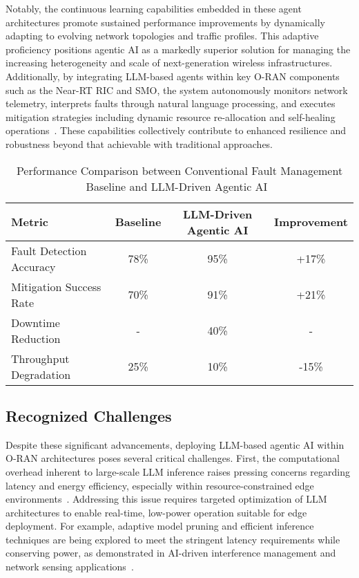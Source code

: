 \documentclass[sigconf]{acmart}
\begin{document}
Notably, the continuous learning capabilities embedded in these agent architectures promote sustained performance improvements by dynamically adapting to evolving network topologies and traffic profiles. This adaptive proficiency positions agentic AI as a markedly superior solution for managing the increasing heterogeneity and scale of next-generation wireless infrastructures. Additionally, by integrating LLM-based agents within key O-RAN components such as the Near-RT RIC and SMO, the system autonomously monitors network telemetry, interprets faults through natural language processing, and executes mitigation strategies including dynamic resource re-allocation and self-healing operations~\cite{ref55}. These capabilities collectively contribute to enhanced resilience and robustness beyond that achievable with traditional approaches.

\begin{table*}[htbp]
\centering
\caption{Performance Comparison between Conventional Fault Management Baseline and LLM-Driven Agentic AI~\cite{ref55}}
\label{tab:performance_comparison}
\begin{adjustbox}{max width=\textwidth}
\begin{tabular}{@{}lccc@{}}
\toprule
Metric & Baseline & LLM-Driven Agentic AI & Improvement \\ \midrule
Fault Detection Accuracy & 78\% & 95\% & +17\% \\
Mitigation Success Rate & 70\% & 91\% & +21\% \\
Downtime Reduction & - & 40\% & - \\
Throughput Degradation & 25\% & 10\% & -15\% \\ \bottomrule
\end{tabular}
\end{adjustbox}
\end{table*}

\subsection{Recognized Challenges}

Despite these significant advancements, deploying LLM-based agentic AI within O-RAN architectures poses several critical challenges. First, the computational overhead inherent to large-scale LLM inference raises pressing concerns regarding latency and energy efficiency, especially within resource-constrained edge environments~\cite{ref55,ref48}. Addressing this issue requires targeted optimization of LLM architectures to enable real-time, low-power operation suitable for edge deployment. For example, adaptive model pruning and efficient inference techniques are being explored to meet the stringent latency requirements while conserving power, as demonstrated in AI-driven interference management and network sensing applications~\cite{ref48,ref55}. 
\end{document}
